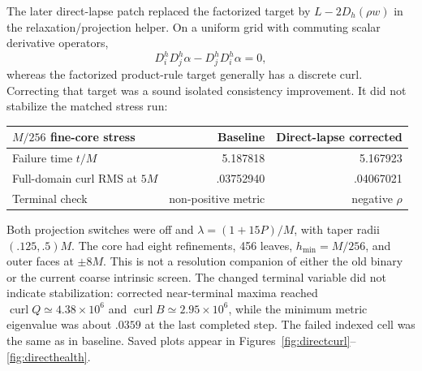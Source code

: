 \documentclass[11pt,letterpaper]{article}
\begin{document}
The later direct-lapse patch replaced the factorized target by $L-2D_h(\rho w)$ in the relaxation/projection helper. On a uniform grid with commuting scalar derivative operators,
\begin{equation}
D_i^hD_j^h\alpha-D_j^hD_i^h\alpha=0,
\end{equation}
whereas the factorized product-rule target generally has a discrete curl. Correcting that target was a sound isolated consistency improvement. It did not stabilize the matched stress run:
\begin{center}\begin{tabular}{lrr}\toprule
$M/256$ fine-core stress & Baseline & Direct-lapse corrected\\\midrule
Failure time $t/M$ & 5.187818 & 5.167923\\
Full-domain curl RMS at $5M$ & .03752940 & .04067021\\
Terminal check & non-positive metric & negative $\rho$\\\bottomrule
\end{tabular}\end{center}
Both projection switches were off and $\lambda=(1+15P)/M$, with taper radii $(.125,.5)M$. The core had eight refinements, 456 leaves, $h_{\min}=M/256$, and outer faces at $\pm8M$. This is not a resolution companion of either the old binary or the current coarse intrinsic screen. The changed terminal variable did not indicate stabilization: corrected near-terminal maxima reached $\operatorname{curl}Q\simeq4.38\times10^6$ and $\operatorname{curl}B\simeq2.95\times10^6$, while the minimum metric eigenvalue was about $.0359$ at the last completed step. The failed indexed cell was the same as in baseline. Saved plots appear in Figures~\ref{fig:directcurl}--\ref{fig:directhealth}.
\end{document}
